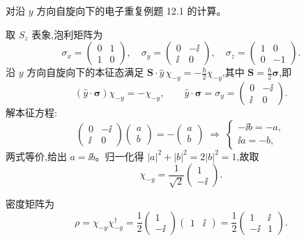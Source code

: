 \begin{question}
对沿 $y$ 方向自旋向下的电子重复例题 12.1 的计算。
\end{question}
\begin{solution}
取 $S_z$ 表象,泡利矩阵为
\[
\sigma_x = \begin{pmatrix}0&1\\1&0\end{pmatrix},\quad
\sigma_y = \begin{pmatrix}0&-\ii\\\ii&0\end{pmatrix},\quad
\sigma_z = \begin{pmatrix}1&0\\0&-1\end{pmatrix}.
\]
沿 $y$ 方向自旋向下的本征态满足 $\mathbf S\cdot\hat y\,\chi_{-y} = -\frac{\hbar}{2}\chi_{-y}$,其中 $\mathbf S = \frac{\hbar}{2}\boldsymbol\sigma$,即
\[
(\hat y\cdot\boldsymbol\sigma)\chi_{-y} = -\chi_{-y},\qquad
\hat y\cdot\boldsymbol\sigma = \sigma_y = \begin{pmatrix}0&-\ii\\\ii&0\end{pmatrix}.
\]
解本征方程:
\[
\begin{pmatrix}0&-\ii\\\ii&0\end{pmatrix}\begin{pmatrix}a\\b\end{pmatrix} = -\begin{pmatrix}a\\b\end{pmatrix}
\;\Longrightarrow\;
\begin{cases}
-\ii b = -a,\\
\ii a = -b,
\end{cases}
\]
两式等价,给出 $a = \ii b$。归一化得 $|a|^2+|b|^2 = 2|b|^2 = 1$,故取
\[
\chi_{-y} = \frac{1}{\sqrt{2}}\begin{pmatrix}1\\-\ii\end{pmatrix}.
\]

密度矩阵为
\[
\rho = \chi_{-y}\chi_{-y}^\dagger
= \frac{1}{2}\begin{pmatrix}1\\-\ii\end{pmatrix}\begin{pmatrix}1&\ii\end{pmatrix}
= \frac{1}{2}\begin{pmatrix}1 & \ii\\ -\ii & 1\end{pmatrix}.
\]


\end{solution}

